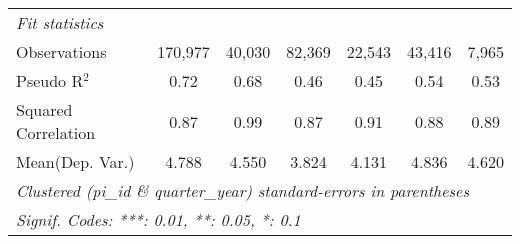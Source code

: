 \begin{tabular}{lcccccc}
   \midrule
   \emph{Fit statistics}\\
   Observations                                               & 170,977     & 40,030       & 82,369       & 22,543        & 43,416      & 7,965\\  
   Pseudo R$^2$                                               & 0.72        & 0.68         & 0.46         & 0.45          & 0.54        & 0.53\\  
   Squared Correlation                                        & 0.87        & 0.99         & 0.87         & 0.91          & 0.88        & 0.89\\  
Mean(Dep. Var.) & 4.788 & 4.550 & 3.824 & 4.131 & 4.836 & 4.620 \\
   \midrule \midrule
   \multicolumn{7}{l}{\emph{Clustered (pi\_id \& quarter\_year) standard-errors in parentheses}}\\
   \multicolumn{7}{l}{\emph{Signif. Codes: ***: 0.01, **: 0.05, *: 0.1}}\\
\end{tabular}
\par\endgroup
